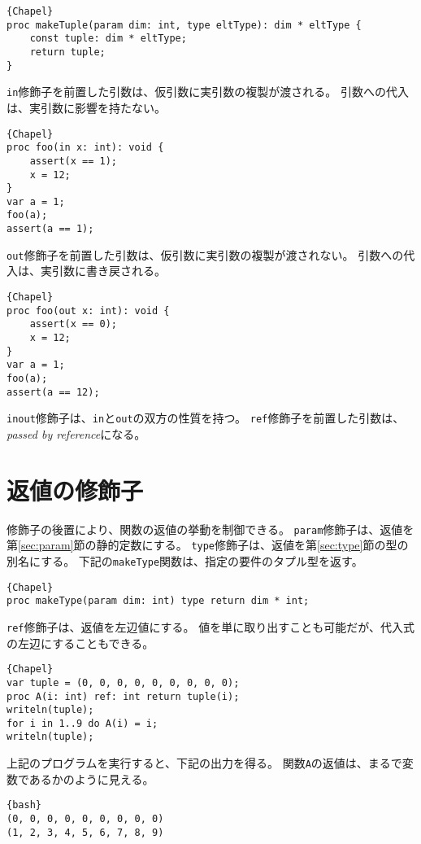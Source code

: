 \documentclass[10pt,a4paper]{book}
\begin{document}
\begin{Verbatim}{Chapel}
proc makeTuple(param dim: int, type eltType): dim * eltType {
	const tuple: dim * eltType;
	return tuple;
}
\end{Verbatim}

\verb#in#修飾子を前置した引数は、仮引数に実引数の複製が渡される。
引数への代入は、実引数に影響を持たない。

\begin{Verbatim}{Chapel}
proc foo(in x: int): void {
	assert(x == 1);
	x = 12;
}
var a = 1;
foo(a);
assert(a == 1);
\end{Verbatim}

\verb#out#修飾子を前置した引数は、仮引数に実引数の複製が渡されない。
引数への代入は、実引数に書き戻される。

\begin{Verbatim}{Chapel}
proc foo(out x: int): void {
	assert(x == 0);
	x = 12;
}
var a = 1;
foo(a);
assert(a == 12);
\end{Verbatim}

\verb#inout#修飾子は、\verb#in#と\verb#out#の双方の性質を持つ。
\verb#ref#修飾子を前置した引数は、\textit{passed by reference}になる。

\section{返値の修飾子}

修飾子の後置により、関数の返値の挙動を制御できる。
\verb#param#修飾子は、返値を第\ref{sec:param}節の静的定数にする。
\verb#type#修飾子は、返値を第\ref{sec:type}節の型の別名にする。
下記の\verb#makeType#関数は、指定の要件のタプル型を返す。

\begin{Verbatim}{Chapel}
proc makeType(param dim: int) type return dim * int;
\end{Verbatim}

\verb#ref#修飾子は、返値を左辺値にする。
値を単に取り出すことも可能だが、代入式の左辺にすることもできる。

\begin{Verbatim}{Chapel}
var tuple = (0, 0, 0, 0, 0, 0, 0, 0, 0);
proc A(i: int) ref: int return tuple(i);
writeln(tuple);
for i in 1..9 do A(i) = i;
writeln(tuple);
\end{Verbatim}

上記のプログラムを実行すると、下記の出力を得る。
関数\verb#A#の返値は、まるで変数であるかのように見える。

\begin{Verbatim}{bash}
(0, 0, 0, 0, 0, 0, 0, 0, 0)
(1, 2, 3, 4, 5, 6, 7, 8, 9)
\end{Verbatim}
\end{document}
